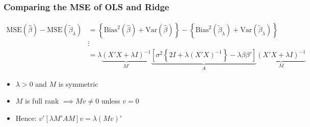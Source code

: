 \begin{frame}
  \frametitle{Comparing the MSE of OLS and Ridge}
  \scriptsize
\begin{align*}
  \text{MSE}(\widehat{\beta}) - \text{MSE}(\widetilde{\beta}_{\lambda}) &= \left\{ \text{Bias}^2(\widehat{\beta}) + \text{Var}(\widehat{\beta}) \right\} - \left\{ \text{Bias}^2(\widetilde{\beta}_\lambda) + \text{Var}(\widetilde{\beta}_\lambda) \right\}\\
  &\vdots \\
  &= \lambda \underbrace{(X'X + \lambda I)^{-1}}_{M'}\underbrace{\left[\sigma^2 \left\{ 2I + \lambda(X'X)^{-1} \right\} - \lambda \beta \beta'  \right]}_{A}\underbrace{\left( X'X + \lambda I \right)^{-1}}_{M}
\end{align*}
\normalsize

\begin{itemize}
  \item $\lambda > 0$ and $M$ is symmetric
  \item $M$ is full rank $\implies Mv \neq 0$ unless $v = 0$
  \item Hence: $v'[\lambda M'AM] v = \lambda (Mv)'$
\end{itemize}

\end{frame}
